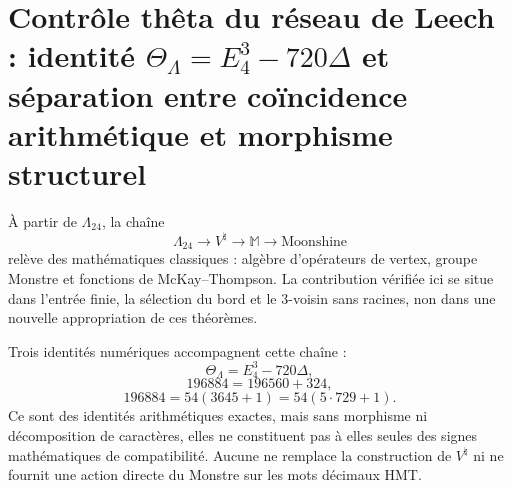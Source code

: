 \section{Contrôle thêta du réseau de Leech : identité \texorpdfstring{\(\Theta_{\Lambda}=E_4^3-720\Delta\)}{Theta Lambda = E4^3 - 720 Delta} et séparation entre coïncidence arithmétique et morphisme structurel}
\label{sec:control-theta-leech}

À partir de \(\Lambda_{24}\), la chaîne
\[
\Lambda_{24}
\longrightarrow V^\natural
\longrightarrow\mathbb M
\longrightarrow\text{Moonshine}
\]
relève des mathématiques classiques : algèbre d'opérateurs de vertex, groupe Monstre et
fonctions de McKay--Thompson. La contribution vérifiée ici se situe dans l'entrée
finie, la sélection du bord et le \(3\)-voisin sans racines, non dans une nouvelle
appropriation de ces théorèmes.

Trois identités numériques accompagnent cette chaîne :
\[
\Theta_{\Lambda}=E_4^3-720\Delta,
\]
\[
196884=196560+324,
\]
\[
196884=54(3645+1)=54(5\cdot729+1).
\]
Ce sont des identités arithmétiques exactes, mais sans morphisme ni décomposition
de caractères, elles ne constituent pas à elles seules des signes mathématiques de
compatibilité. Aucune ne remplace la construction de \(V^\natural\) ni
ne fournit une action directe du Monstre sur les mots décimaux HMT.
